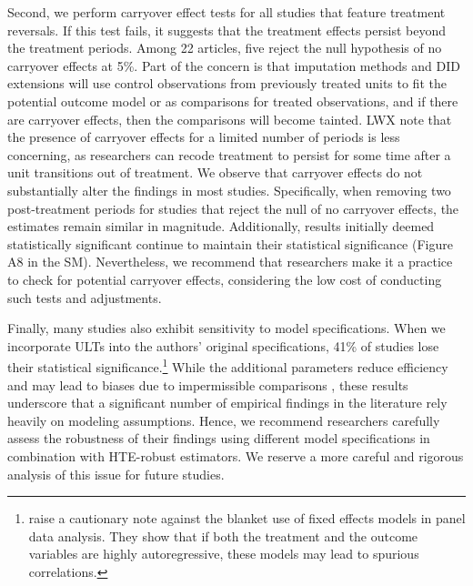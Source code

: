 \documentclass[12pt]{article}
\begin{document}
Second, we perform carryover effect tests for all studies that feature treatment reversals. If this test fails, it suggests that the treatment effects persist beyond the treatment periods. Among 22 articles, five reject the null hypothesis of no carryover effects at 5\%. Part of the concern is that imputation methods and DID extensions will use control observations from previously treated units to fit the potential outcome model or as comparisons for treated observations, and if there are carryover effects, then the comparisons will become tainted.
LWX \citeyearpar{LWX2022} note that the presence of carryover effects for a limited number of periods is less concerning, as researchers can recode treatment to persist for some time after a unit transitions out of treatment. %
We observe that carryover effects do not substantially alter the findings in most studies. Specifically, when removing two post-treatment periods for studies that reject the null of no carryover effects, the estimates remain similar in magnitude. Additionally, results initially deemed statistically significant continue to maintain their statistical significance (Figure A8 in the SM). Nevertheless, we recommend that researchers make it a practice to check for potential carryover effects, considering the low cost of conducting such tests and adjustments.

Finally, many studies also exhibit sensitivity to model specifications. When we incorporate ULTs into the authors' original specifications, 41\% of studies lose their statistical significance.\footnote{\citet{plumper2019not} raise a cautionary note against the blanket use of fixed effects models in panel data analysis. They show that if both the treatment and the outcome variables are highly autoregressive, these models may lead to spurious correlations.} While the additional parameters reduce efficiency and may lead to biases due to impermissible comparisons \citep{Goodman-Bacon2021-xb}, these results underscore that a significant number of empirical findings in the literature rely heavily on modeling assumptions. Hence, we recommend researchers carefully assess the robustness of their findings using different model specifications in combination with HTE-robust estimators. We reserve a more careful and rigorous analysis of this issue for future studies. 
\end{document}
